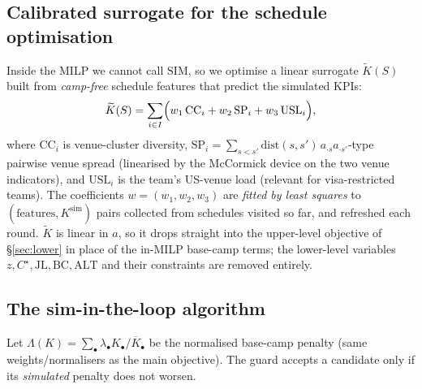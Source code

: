 \documentclass[12pt, letterpaper]{article}
\begin{document}
\subsection{Calibrated surrogate for the schedule optimisation}
\label{sec:surrogate}
Inside the MILP we cannot call $\mathrm{SIM}$, so we optimise a linear
surrogate $\widetilde K(S)$ built from \emph{camp-free} schedule features
that predict the simulated KPIs:
\begin{equation}
\widetilde K(S)=\sum_{i\in I}\Bigl(
  w_1\,\mathrm{CC}_i + w_2\,\mathrm{SP}_i
  + w_3\,\mathrm{USL}_i\Bigr),
\end{equation}
where $\mathrm{CC}_i$ is venue-cluster diversity, $\mathrm{SP}_i=
\sum_{s<s'} \mathrm{dist}(s,s')\,a_{\cdot s}a_{\cdot s'}$-type pairwise
venue spread (linearised by the McCormick device on the two venue
indicators), and $\mathrm{USL}_i$ is the team's US-venue load (relevant
for visa-restricted teams). The coefficients $w=(w_1,w_2,w_3)$ are
\emph{fitted by least squares} to $(\text{features},K^{\mathrm{sim}})$
pairs collected from schedules visited so far, and refreshed each round.
$\widetilde K$ is linear in $a$, so it drops straight into the
upper-level objective of \S\ref{sec:lower} in place of the in-MILP
base-camp terms; the lower-level variables
$z,C^\star,\mathrm{JL},\mathrm{BC},\mathrm{ALT}$ and their constraints are
removed entirely.

\subsection{The sim-in-the-loop algorithm}
Let $\Lambda(K)=\sum_\bullet \lambda_\bullet K_\bullet/\overline K_\bullet$
be the normalised base-camp penalty (same weights/normalisers as the main
objective). The guard accepts a candidate only if its \emph{simulated}
penalty does not worsen.
\end{document}
